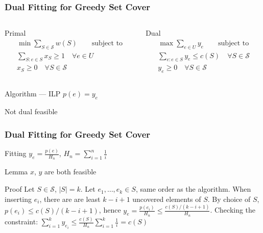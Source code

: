 \documentclass[12pt,aspectratio=169]{beamer}
\begin{document}
\begin{frame}\frametitle{Dual Fitting for Greedy Set Cover }
\begin{columns} 
  \begin{column}{0.48\textwidth}
  \begin{block}{Primal}
    \begin{equation}
    \begin{split}
      \min \sum_{S\in \mathcal{S}} w(S) \qquad\text{subject to}\\
      \sum_{S: e\in S} x_{S}\ge 1\quad \forall e\in U\\
      x_{S}\ge 0\quad \forall S\in \mathcal{S}
     \end{split}
   \end{equation}
 \end{block}
\end{column}
\begin{column}{0.48\textwidth}
  \begin{block}{Dual}
    \begin{equation}
    \begin{split}
      \max \sum_{e\in U} y_{e} \qquad\text{subject to}\\
      \sum_{e: e\in S} y_{e}\le c(S)\quad \forall S\in \mathcal{S}\\
      y_{e}\ge 0\quad \forall S\in \mathcal{S}
     \end{split}
   \end{equation}
 \end{block}
\end{column}
\end{columns}

\centering
 \begin{block}{Algorithm --- ILP}
   $p(e) = y_{e}$
 \end{block}
 Not dual feasible
\end{frame}

\begin{frame}\frametitle{Dual Fitting for Greedy Set Cover }
 \begin{block}{Fitting}
   $y_{e} = \frac{p(e)}{H_{n}}$,  $H_{n} = \sum_{i=1}^{n} \frac{1}{i}$
 \end{block}
 \begin{block}{Lemma}
   $x$, $y$ are both feasible
 \end{block}
 \begin{block}{Proof}
   Let $S\in \mathcal{S}$, $|S|=k$.
%
   Let $e_{1}, \ldots , e_{k}\in S$, same order as the algorithm.
%
   When inserting $e_{i}$, there are are least $k-i+1$ uncovered elements of $S$.
%
   By choice of $S$, $p(e_{i})\le c(S)/(k-i+1)$, hence $y_{e} = \frac{p(e_{i})}{H_{n}}\le
   \frac{c(S)/(k-i+1)}{H_{n}}$.
   Checking the constraint: $\sum_{i=1}^{k}y_{e_{i}} \le  \frac{c(S)}{H_{n}}
   \sum_{i=1}^{k}\frac{1}{i} = c(S)$
 \end{block}
 \end{frame}
\end{document}
